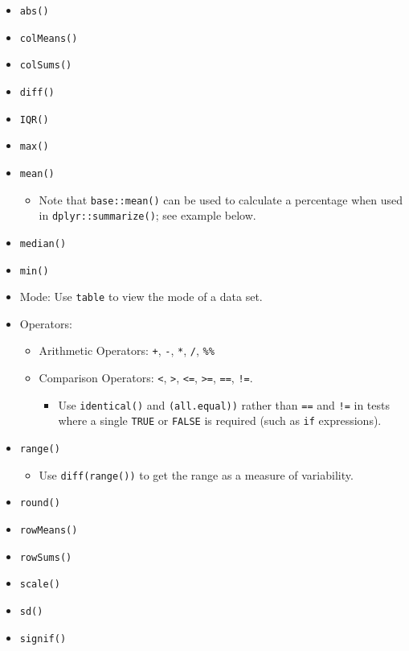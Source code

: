 \documentclass[
]{book}
\providecommand{\tightlist}{%
  \setlength{\itemsep}{0pt}\setlength{\parskip}{0pt}}
\begin{document}
\begin{itemize}
\tightlist
\item
  \texttt{abs()}
\item
  \texttt{colMeans()}
\item
  \texttt{colSums()}
\item
  \texttt{diff()}
\item
  \texttt{IQR()}
\item
  \texttt{max()}
\item
  \texttt{mean()}

  \begin{itemize}
  \tightlist
  \item
    Note that \texttt{base::mean()} can be used to calculate a percentage when used in \texttt{dplyr::summarize()}; see example below.
  \end{itemize}
\item
  \texttt{median()}
\item
  \texttt{min()}
\item
  Mode: Use \texttt{table} to view the mode of a data set.
\item
  Operators:

  \begin{itemize}
  \tightlist
  \item
    Arithmetic Operators: \texttt{+}, \texttt{-}, \texttt{*}, \texttt{/}, \texttt{\%\%}
  \item
    Comparison Operators: \texttt{\textless{}}, \texttt{\textgreater{}}, \texttt{\textless{}=}, \texttt{\textgreater{}=}, \texttt{==}, \texttt{!=}.

    \begin{itemize}
    \tightlist
    \item
      Use \texttt{identical()} and \texttt{(all.equal))} rather than \texttt{==} and \texttt{!=} in tests where a single \texttt{TRUE} or \texttt{FALSE} is required (such as \texttt{if} expressions).
    \end{itemize}
  \end{itemize}
\item
  \texttt{range()}

  \begin{itemize}
  \tightlist
  \item
    Use \texttt{diff(range())} to get the range as a measure of variability.
  \end{itemize}
\item
  \texttt{round()}
\item
  \texttt{rowMeans()}
\item
  \texttt{rowSums()}
\item
  \texttt{scale()}
\item
  \texttt{sd()}
\item
  \texttt{signif()}


\end{itemize}
\end{document}
